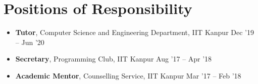 \newcommand{\por}[3]{\textbf{#1}, #2 \hfill #3}

\section*{Positions of Responsibility}
\begin{itemize}

\setlength\itemsep{0pt}
\item \por{Tutor}{Computer Science and Engineering Department, IIT Kanpur}{Dec '19 -- Jun '20}%
\item \por{Secretary}{Programming Club, IIT Kanpur}{Aug '17 -- Apr '18}%
\item \por{Academic Mentor}{Counselling Service, IIT Kanpur}{Mar '17 -- Feb '18}%

\end{itemize}
